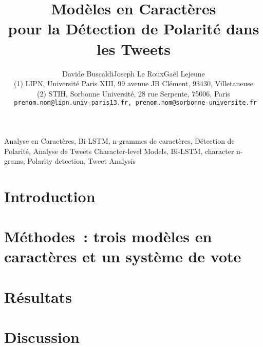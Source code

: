 \documentclass[10pt,twoside]{article}
\title{Modèles en Caractères\\ pour la Détection de Polarité dans les Tweets}
\author{Davide Buscaldi\up{1}\quad Joseph Le Roux\up{1}\quad Gaël Lejeune\up{2}\\
  {\small
    (1) LIPN, Université Paris XIII, 99 avenue JB Clément, 93430, Villetaneuse \\ 
    (2) STIH, Sorbonne Université, 28 rue Serpente, 75006, Paris \\ 
    \texttt{
      prenom.nom@lipn.univ-paris13.fr, prenom.nom@sorbonne-universite.fr \\ 
}}}
\begin{document}
\maketitle

\resume{

}


\motsClefs
  {Analyse en Caractères, Bi-LSTM, n-grammes de caractères, Détection de Polarité, Analyse de Tweets}
  {Character-level Models, Bi-LSTM, character n-grams, Polarity detection, Tweet Analysis}


\section{Introduction}


%

\section{Méthodes~: trois modèles en caractères et un système de vote}


\section{Résultats}


\section{Discussion}







\end{document}

